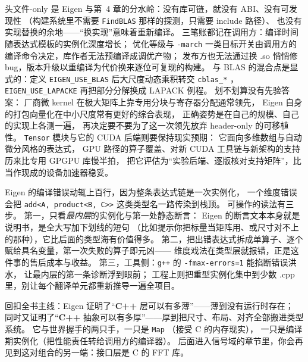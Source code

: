 \documentclass[12pt,a4paper,fontset=fandol]{ctexbook}
\newcommand{\Tp}[1]{\texttt{#1}}
\newcommand{\Bk}{\allowbreak}
\newcommand{\Lang}[1]{\textsf{\bfseries #1}}
\newcommand{\CPP}{\Lang{C++}}
\begin{document}
头文件-only 是 Eigen 与第~4 章的分水岭：没有库可链，就没有 ABI、没有可发现性
（构建系统里不需要 \Tp{FindBLAS} \Bk{} 那样的探测，只需要 include 路径）、
也没有实现替换的余地——``换实现''意味着重新编译。
三笔账都记在调用方：编译时间随表达式模板的实例化深度增长；
优化等级与 \Tp{-march} \Bk{} 一类目标开关由调用方的编译命令决定，库作者无法预编译成调优产物；
发布方也无法通过换 .so 悄悄修 bug，版本升级以重编译为代价换来逐位可复现的构建。
与 BLAS 的混合点是显式的：定义 \Tp{EIGEN\_USE\_BLAS} \Bk{} 后大尺度动态乘积转交 \Tp{cblas\_*} \Bk{}，
\Tp{EIGEN\_USE\_LAPACKE} \Bk{} 再把部分分解换成 LAPACK 例程。
划不划算没有先验答案：
厂商微 kernel 在极大矩阵上靠专用分块与寄存器分配通常领先，
Eigen 自身的打包向量化在中小尺度常有更好的综合表现，
正确姿势是在自己的规模、自己的实现上各测一遍，
再决定要不要为了这一次领先放弃 header-only 的可移植性。
\Tp{Tensor} \Bk{} 模块与它的 CUDA 后端则要保持现实预期：
它面向多维数组与自动微分风格的表达式，
GPU 路径的算子覆盖、对新 CUDA 工具链与新架构的支持历来比专用 GPGPU 库慢半拍，
把它评估为``实验后端、逐版核对支持矩阵''，比当作现成的设备加速器稳妥。

\begin{note}[title={模板报错的三步读法}]
Eigen 的编译错误动辄上百行，因为整条表达式链是一次实例化，
一个维度错误会把 \Tp{add<A, product<B, C>>} \Bk{} 这类类型名一路传染到栈顶。
可操作的读法有三步。
第一，只看\emph{最内层}的实例化与第一处静态断言：
Eigen 的断言文本本身就是说明书，是全大写加下划线的短句
（比如提示你把标量当矩阵用、或尺寸对不上的那种），它比后面的类型海有价值得多。
第二，把出错表达式拆成单算子、逐个赋给具名变量，第一次失败的算子即元凶——
维度戏法在类型层就报错，正是这件事的售后成本与收益。
第三，工具侧：\Tp{g++} 的 \Tp{-fmax-errors=1} \Bk{} 能掐断错误洪水，
让最内层的第一条诊断浮到眼前；
工程上则把重型实例化集中到少数 .cpp 里，别让每个翻译单元都重新推导一遍全项目。
\end{note}

回扣全书主线：Eigen 证明了``\CPP{} 层可以有多薄''——薄到没有运行时存在；
同时又证明了``\CPP{} 抽象可以有多厚''——厚到把尺寸、布局、对齐全部搬进类型系统。
它与世界握手的两只手，一只是 \Tp{Map} \Bk{}（接受 C 的内存现实），
一只是编译期实例化（把性能责任转给调用方的编译器）。
后面进入信号域的章节里，你会再见到这对组合的另一端：接口层是 C 的 FFT 库。


\end{document}

